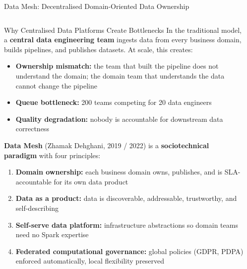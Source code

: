 \documentclass[aspectratio=169,10pt]{beamer}
\begin{document}
\begin{frame}[fragile]{Data Mesh: Decentralised Domain-Oriented Data Ownership}
  \begin{columns}[T]
      \begin{block}{Why Centralised Data Platforms Create Bottlenecks}
        In the traditional model, a \textbf{central data engineering team} ingests data from every business domain, builds pipelines, and publishes datasets.  At scale, this creates:
        \begin{itemize}
          \item \textbf{Ownership mismatch:} the team that built the pipeline does not understand the domain; the domain team that understands the data cannot change the pipeline
          \item \textbf{Queue bottleneck:} 200 teams competing for 20 data engineers
          \item \textbf{Quality degradation:} nobody is accountable for downstream data correctness
        \end{itemize}
        \vspace{4pt}
        \textbf{Data Mesh} (Zhamak Dehghani, 2019 / 2022) is a \textbf{sociotechnical paradigm} with four principles:
        \begin{enumerate}
          \item \textbf{Domain ownership:} each business domain owns, publishes, and is SLA-accountable for its own data product
          \item \textbf{Data as a product:} data is discoverable, addressable, trustworthy, and self-describing
          \item \textbf{Self-serve data platform:} infrastructure abstractions so domain teams need no Spark expertise
          \item \textbf{Federated computational governance:} global policies (GDPR, PDPA) enforced automatically, local flexibility preserved
        \end{enumerate}
      \end{block}

      \begin{center}
\end{center}
\end{columns}
\end{frame}
\end{document}
